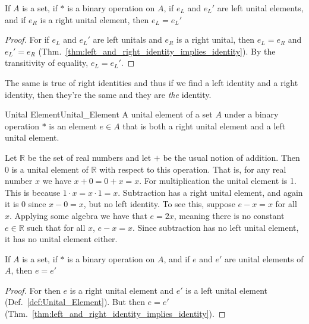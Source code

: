     \begin{theorem}
        If $A$ is a set, if $*$ is a binary operation on $A$, if $e_{L}$ and
        $e_{L}'$ are left unital elements, and if $e_{R}$ is a right unital
        element, then $e_{L}=e_{L}'$
    \end{theorem}
    \begin{proof}
        For if $e_{L}$ and $e_{L}'$ are left unitals and $e_{R}$ is a right
        unital, then $e_{L}=e_{R}$ and $e_{L}'=e_{R}$
        (Thm.~\ref{thm:left_and_right_identity_implies_identity}). By the
        transitivity of equality, $e_{L}=e_{L}'$.
    \end{proof}
    The same is true of right identities and thus if we find a left identity and
    a right identity, then they're the same and they are \textit{the} identity.
    \begin{fdefinition}{Unital Element}{Unital_Element}
        A \gls{unital element} of a \gls{set} $A$ under a \gls{binary operation}
        $*$ is an element $e\in{A}$ that is both a right unital element and a
        left unital element.
    \end{fdefinition}
    \begin{example}
        Let $\mathbb{R}$ be the set of real numbers and let $+$ be the usual
        notion of addition. Then 0 is a unital element of $\mathbb{R}$ with
        respect to this operation. That is, for any real number $x$ we have
        $x+0=0+x=x$. For multiplication the unital element is 1. This is because
        $1\cdot{x}=x\cdot{1}=x$. Subtraction has a right unital element, and
        again it is 0 since $x-0=x$, but no left identity. To see this, suppose
        $e-x=x$ for all $x$. Applying some algebra we have that $e=2x$, meaning
        there is no constant $e\in\mathbb{R}$ such that for all $x$, $e-x=x$.
        Since subtraction has no left unital element, it has no unital element
        either.
    \end{example}
    \begin{theorem}
        \label{thm:Unital_Elements_are_Unique}%
        If $A$ is a set, if $*$ is a binary operation on $A$, and if $e$ and
        $e'$ are unital elements of $A$, then $e=e'$
    \end{theorem}
    \begin{proof}
        For then $e$ is a right unital element and $e'$ is a left unital element
        (Def.~\ref{def:Unital_Element}). But then $e=e'$
        (Thm.~\ref{thm:left_and_right_identity_implies_identity}).
    \end{proof}

